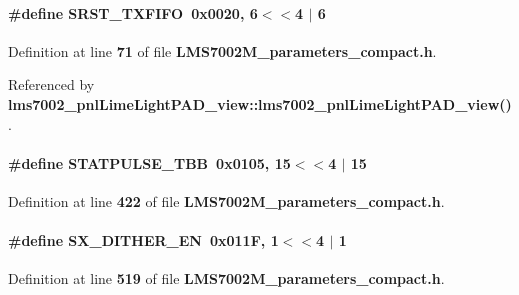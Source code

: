 \paragraph[{S\+R\+S\+T\+\_\+\+T\+X\+F\+I\+FO}]{\setlength{\rightskip}{0pt plus 5cm}\#define S\+R\+S\+T\+\_\+\+T\+X\+F\+I\+FO~0x0020, 6$<$$<$4 $\vert$  6}\label{LMS7002M__parameters__compact_8h_a6f5e8bf64754e7bdcf2f9ba5f05e7254}


Definition at line {\bf 71} of file {\bf L\+M\+S7002\+M\+\_\+parameters\+\_\+compact.\+h}.



Referenced by {\bf lms7002\+\_\+pnl\+Lime\+Light\+P\+A\+D\+\_\+view\+::lms7002\+\_\+pnl\+Lime\+Light\+P\+A\+D\+\_\+view()}.

\paragraph[{S\+T\+A\+T\+P\+U\+L\+S\+E\+\_\+\+T\+BB}]{\setlength{\rightskip}{0pt plus 5cm}\#define S\+T\+A\+T\+P\+U\+L\+S\+E\+\_\+\+T\+BB~0x0105, 15$<$$<$4 $\vert$  15}\label{LMS7002M__parameters__compact_8h_ae8f15a5786aa2cac8c6bcbb720c73da9}


Definition at line {\bf 422} of file {\bf L\+M\+S7002\+M\+\_\+parameters\+\_\+compact.\+h}.

\paragraph[{S\+X\+\_\+\+D\+I\+T\+H\+E\+R\+\_\+\+EN}]{\setlength{\rightskip}{0pt plus 5cm}\#define S\+X\+\_\+\+D\+I\+T\+H\+E\+R\+\_\+\+EN~0x011\+F, 1$<$$<$4 $\vert$  1}\label{LMS7002M__parameters__compact_8h_a9b42b1fee07b2a50d970d8d2f983043f}


Definition at line {\bf 519} of file {\bf L\+M\+S7002\+M\+\_\+parameters\+\_\+compact.\+h}.



